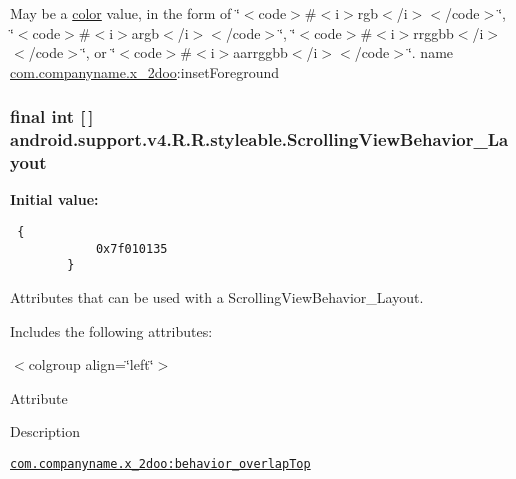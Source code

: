 May be a \hyperlink{classandroid_1_1support_1_1v4_1_1_r_1_1color}{color} value, in the form of \char`\"{}$<$code$>$\#$<$i$>$rgb$<$/i$>$$<$/code$>$\char`\"{}, \char`\"{}$<$code$>$\#$<$i$>$argb$<$/i$>$$<$/code$>$\char`\"{}, \char`\"{}$<$code$>$\#$<$i$>$rrggbb$<$/i$>$$<$/code$>$\char`\"{}, or \char`\"{}$<$code$>$\#$<$i$>$aarrggbb$<$/i$>$$<$/code$>$\char`\"{}.  name \hyperlink{namespacecom_1_1companyname_1_1x__2doo}{com.companyname.x\_\-2doo}:insetForeground \hypertarget{classandroid_1_1support_1_1v4_1_1_r_1_1styleable_7f394b84e58daeccda900f698e6700ca}{
\subsubsection[{ScrollingViewBehavior\_\-Layout}]{\setlength{\rightskip}{0pt plus 5cm}final int \mbox{[}$\,$\mbox{]} android.support.v4.R.R.styleable.ScrollingViewBehavior\_\-Layout}}
\label{classandroid_1_1support_1_1v4_1_1_r_1_1styleable_7f394b84e58daeccda900f698e6700ca}


\textbf{Initial value:}

\begin{Code}\begin{verbatim} {
            0x7f010135
        }
\end{verbatim}
\end{Code}
Attributes that can be used with a ScrollingViewBehavior\_\-Layout. 

Includes the following attributes: \begin{TabularC}{0}
\hline
\end{TabularC}
$<$colgroup align=\char`\"{}left\char`\"{}$>$ 

Attribute

Description 

{\tt \hyperlink{classandroid_1_1support_1_1v4_1_1_r_1_1styleable_9fea49ba22c6071b652bd5d634a21a47}{com.companyname.x\_\-2doo:behavior\_\-overlapTop}}

